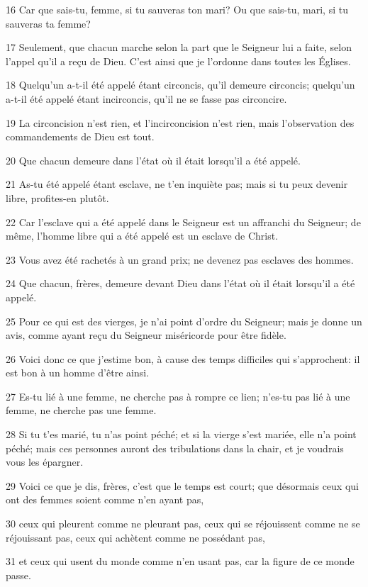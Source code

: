 \par 16 Car que sais-tu, femme, si tu sauveras ton mari? Ou que sais-tu, mari, si tu sauveras ta femme?
\par 17 Seulement, que chacun marche selon la part que le Seigneur lui a faite, selon l'appel qu'il a reçu de Dieu. C'est ainsi que je l'ordonne dans toutes les Églises.
\par 18 Quelqu'un a-t-il été appelé étant circoncis, qu'il demeure circoncis; quelqu'un a-t-il été appelé étant incirconcis, qu'il ne se fasse pas circoncire.
\par 19 La circoncision n'est rien, et l'incirconcision n'est rien, mais l'observation des commandements de Dieu est tout.
\par 20 Que chacun demeure dans l'état où il était lorsqu'il a été appelé.
\par 21 As-tu été appelé étant esclave, ne t'en inquiète pas; mais si tu peux devenir libre, profites-en plutôt.
\par 22 Car l'esclave qui a été appelé dans le Seigneur est un affranchi du Seigneur; de même, l'homme libre qui a été appelé est un esclave de Christ.
\par 23 Vous avez été rachetés à un grand prix; ne devenez pas esclaves des hommes.
\par 24 Que chacun, frères, demeure devant Dieu dans l'état où il était lorsqu'il a été appelé.
\par 25 Pour ce qui est des vierges, je n'ai point d'ordre du Seigneur; mais je donne un avis, comme ayant reçu du Seigneur miséricorde pour être fidèle.
\par 26 Voici donc ce que j'estime bon, à cause des temps difficiles qui s'approchent: il est bon à un homme d'être ainsi.
\par 27 Es-tu lié à une femme, ne cherche pas à rompre ce lien; n'es-tu pas lié à une femme, ne cherche pas une femme.
\par 28 Si tu t'es marié, tu n'as point péché; et si la vierge s'est mariée, elle n'a point péché; mais ces personnes auront des tribulations dans la chair, et je voudrais vous les épargner.
\par 29 Voici ce que je dis, frères, c'est que le temps est court; que désormais ceux qui ont des femmes soient comme n'en ayant pas,
\par 30 ceux qui pleurent comme ne pleurant pas, ceux qui se réjouissent comme ne se réjouissant pas, ceux qui achètent comme ne possédant pas,
\par 31 et ceux qui usent du monde comme n'en usant pas, car la figure de ce monde passe.
